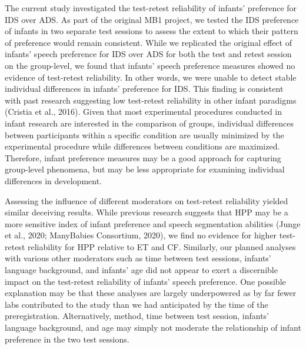 \documentclass[
  english,
  man,floatsintext]{apa6}
\begin{document}
The current study investigated the test-retest reliability of infants' preference for IDS over ADS.
As part of the original MB1 project, we tested the IDS preference of infants in two separate test sessions to assess the extent to which their pattern of preference would remain consistent.
While we replicated the original effect of infants' speech preference for IDS over ADS for both the test and retest session on the group-level, we found that infants' speech preference measures showed no evidence of test-retest reliability.
In other words, we were unable to detect stable individual differences in infants' preference for IDS.
This finding is consistent with past research suggesting low test-retest reliability in other infant paradigms (Cristia et al., 2016).
Given that most experimental procedures conducted in infant research are interested in the comparison of groups, individual differences between participants within a specific condition are usually minimized by the experimental procedure while differences between conditions are maximized.
Therefore, infant preference measures may be a good approach for capturing group-level phenomena, but may be less appropriate for examining individual differences in development.

Assessing the influence of different moderators on test-retest reliability yielded similar deceiving results. While previous research suggests that HPP may be a more sensitive index of infant preference and speech segmentation abilities (Junge et al., 2020; ManyBabies Consortium, 2020), we find no evidence for higher test-retest reliability for HPP relative to ET and CF. Similarly, our planned analyses with various other moderators such as time between test sessions, infants' language background, and infants' age did not appear to exert a discernible impact on the test-retest reliability of infants' speech preference. One possible explanation may be that these analyses are largely underpowered as by far fewer labs contributed to the study than we had anticipated by the time of the preregistration. Alternatively, method, time between test session, infants' language background, and age may simply not moderate the relationship of infant preference in the two test sessions.
\end{document}
